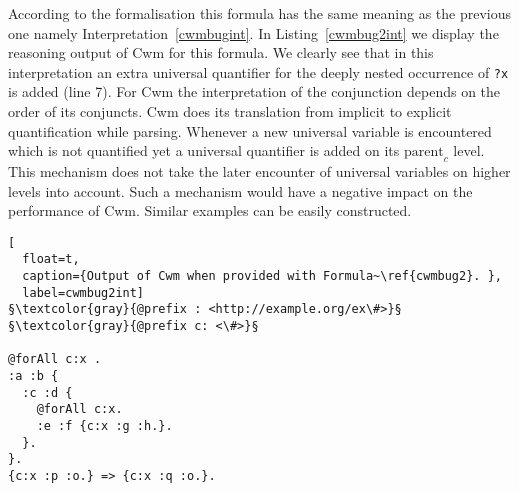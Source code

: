 According to the formalisation this formula has the same meaning as the previous one namely Interpretation~\ref{cwmbugint}. 
In Listing~\ref{cwmbug2int} we display the reasoning output of Cwm for this formula. We clearly see that in this interpretation an extra universal quantifier for the
deeply nested occurrence of \texttt{?x} is added (line 7). For Cwm the interpretation of the conjunction depends on the order of its conjuncts. 
 Cwm does its translation from implicit to explicit quantification while parsing. 
Whenever a new universal variable is encountered which is not quantified yet a universal quantifier is added on its $\text{parent}_c$ level. 
This mechanism does not take the later encounter of universal variables on higher 
levels into account. Such a mechanism would have a negative impact on the performance of Cwm. Similar examples can be easily constructed.
\begin{lstlisting}[
  float=t,
  caption={Output of Cwm when provided with Formula~\ref{cwmbug2}. },
  label=cwmbug2int]
§\textcolor{gray}{@prefix : <http://example.org/ex\#>}§
§\textcolor{gray}{@prefix c: <\#>}§
   
@forAll c:x .
:a :b {
  :c :d {
    @forAll c:x. 
    :e :f {c:x :g :h.}.
  }.
}.
{c:x :p :o.} => {c:x :q :o.}.
\end{lstlisting}
%
% 
% 
% 
% 

